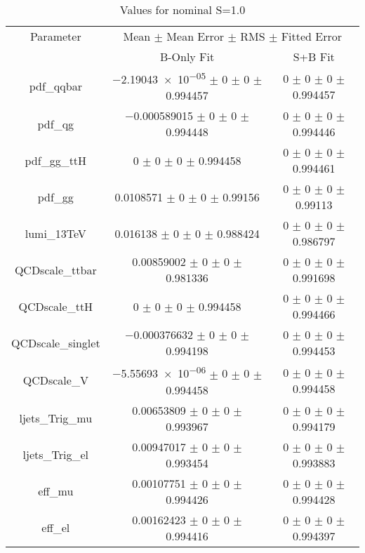 \begin{table}
\centering
\caption{Values for nominal S=1.0}
\begin{tabular}{ccc}
\toprule
Parameter & \multicolumn{2}{c}{Mean $\pm$ Mean Error $\pm$ RMS $\pm$ Fitted Error}\\
 & B-Only Fit & S+B Fit\\
\midrule
pdf\_qqbar & \num{-2.19043e-05} $\pm$ \num{0} $\pm$ \num{0} $\pm$ \num{0.994457} & \num{0} $\pm$ \num{0} $\pm$ \num{0} $\pm$ \num{0.994457}\\
pdf\_qg & \num{-0.000589015} $\pm$ \num{0} $\pm$ \num{0} $\pm$ \num{0.994448} & \num{0} $\pm$ \num{0} $\pm$ \num{0} $\pm$ \num{0.994446}\\
pdf\_gg\_ttH & \num{0} $\pm$ \num{0} $\pm$ \num{0} $\pm$ \num{0.994458} & \num{0} $\pm$ \num{0} $\pm$ \num{0} $\pm$ \num{0.994461}\\
pdf\_gg & \num{0.0108571} $\pm$ \num{0} $\pm$ \num{0} $\pm$ \num{0.99156} & \num{0} $\pm$ \num{0} $\pm$ \num{0} $\pm$ \num{0.99113}\\
lumi\_13TeV & \num{0.016138} $\pm$ \num{0} $\pm$ \num{0} $\pm$ \num{0.988424} & \num{0} $\pm$ \num{0} $\pm$ \num{0} $\pm$ \num{0.986797}\\
QCDscale\_ttbar & \num{0.00859002} $\pm$ \num{0} $\pm$ \num{0} $\pm$ \num{0.981336} & \num{0} $\pm$ \num{0} $\pm$ \num{0} $\pm$ \num{0.991698}\\
QCDscale\_ttH & \num{0} $\pm$ \num{0} $\pm$ \num{0} $\pm$ \num{0.994458} & \num{0} $\pm$ \num{0} $\pm$ \num{0} $\pm$ \num{0.994466}\\
QCDscale\_singlet & \num{-0.000376632} $\pm$ \num{0} $\pm$ \num{0} $\pm$ \num{0.994198} & \num{0} $\pm$ \num{0} $\pm$ \num{0} $\pm$ \num{0.994453}\\
QCDscale\_V & \num{-5.55693e-06} $\pm$ \num{0} $\pm$ \num{0} $\pm$ \num{0.994458} & \num{0} $\pm$ \num{0} $\pm$ \num{0} $\pm$ \num{0.994458}\\
ljets\_Trig\_mu & \num{0.00653809} $\pm$ \num{0} $\pm$ \num{0} $\pm$ \num{0.993967} & \num{0} $\pm$ \num{0} $\pm$ \num{0} $\pm$ \num{0.994179}\\
ljets\_Trig\_el & \num{0.00947017} $\pm$ \num{0} $\pm$ \num{0} $\pm$ \num{0.993454} & \num{0} $\pm$ \num{0} $\pm$ \num{0} $\pm$ \num{0.993883}\\
eff\_mu & \num{0.00107751} $\pm$ \num{0} $\pm$ \num{0} $\pm$ \num{0.994426} & \num{0} $\pm$ \num{0} $\pm$ \num{0} $\pm$ \num{0.994428}\\
eff\_el & \num{0.00162423} $\pm$ \num{0} $\pm$ \num{0} $\pm$ \num{0.994416} & \num{0} $\pm$ \num{0} $\pm$ \num{0} $\pm$ \num{0.994397}\\

\end{tabular}
\end{table}
